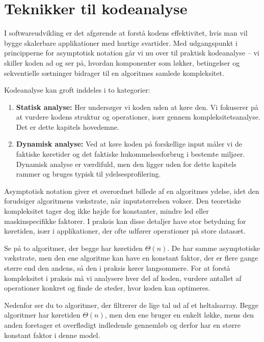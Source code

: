 \chapter{Teknikker til kodeanalyse}\label{chap:ch15}

I softwareudvikling er det afgørende at forstå kodens effektivitet, hvis man vil bygge skalerbare applikationer med hurtige svartider. Med udgangspunkt i principperne for asymptotisk notation går vi nu over til praktisk kodeanalyse -- vi skiller koden ad og ser på, hvordan komponenter som løkker, betingelser og sekventielle sætninger bidrager til en algoritmes samlede kompleksitet.

Kodeanalyse kan groft inddeles i to kategorier:

\begin{enumerate}
    \item \textbf{Statisk analyse:} Her undersøger vi koden uden at køre den. Vi fokuserer på at vurdere kodens struktur og operationer, især gennem kompleksitetsanalyse. Det er dette kapitels hovedemne.
    \item \textbf{Dynamisk analyse:} Ved at køre koden på forskellige input måler vi de faktiske køretider og det faktiske hukommelsesforbrug i bestemte miljøer. Dynamisk analyse er værdifuld, men den ligger uden for dette kapitels rammer og bruges typisk til ydelsesprofilering.
\end{enumerate}

Asymptotisk notation giver et overordnet billede af en algoritmes ydelse, idet den forudsiger algoritmens vækstrate, når inputstørrelsen vokser. Den teoretiske kompleksitet tager dog ikke højde for konstanter, mindre led eller maskinspecifikke faktorer. I praksis kan disse detaljer have stor betydning for køretiden, især i applikationer, der ofte udfører operationer på store datasæt.

Se på to algoritmer, der begge har køretiden $\Theta(n)$. De har samme asymptotiske vækstrate, men den ene algoritme kan have en konstant faktor, der er flere gange større end den andens, så den i praksis kører langsommere. For at forstå kompleksitet i praksis må vi analysere hver del af koden, vurdere antallet af operationer konkret og finde de steder, hvor koden kan optimeres.

Nedenfor ser du to algoritmer, der filtrerer de lige tal ud af et heltalsarray. Begge algoritmer har køretiden $\Theta(n)$, men den ene bruger en enkelt løkke, mens den anden foretager et overflødigt indledende gennemløb og derfor har en større konstant faktor i denne model.


